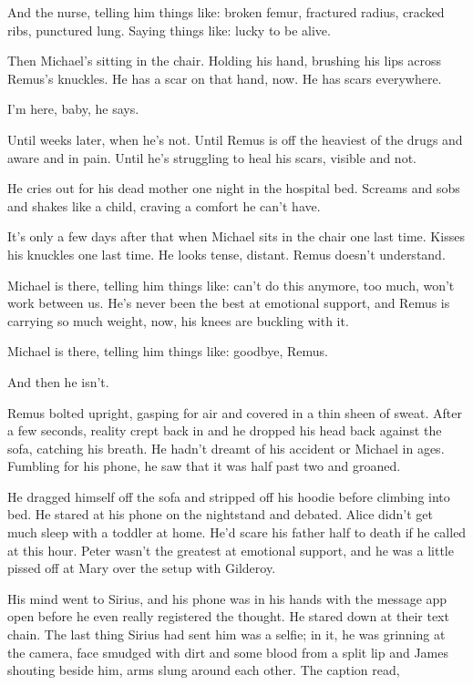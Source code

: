 And the nurse, telling him things like: broken femur, fractured radius, cracked ribs, punctured lung. Saying things like: lucky to be alive.

Then Michael’s sitting in the chair. Holding his hand, brushing his lips across Remus’s knuckles. He has a scar on that hand, now. He has scars everywhere.

I’m here, baby, he says.

Until weeks later, when he’s not. Until Remus is off the heaviest of the drugs and aware and in pain. Until he’s struggling to heal his scars, visible and not.

He cries out for his dead mother one night in the hospital bed. Screams and sobs and shakes like a child, craving a comfort he can’t have.

It’s only a few days after that when Michael sits in the chair one last time. Kisses his knuckles one last time. He looks tense, distant. Remus doesn’t understand.

Michael is there, telling him things like: can’t do this anymore, too much, won’t work between us. He’s never been the best at emotional support, and Remus is carrying so much weight, now, his knees are buckling with it.

Michael is there, telling him things like: goodbye, Remus.

And then he isn’t.

Remus bolted upright, gasping for air and covered in a thin sheen of sweat. After a few seconds, reality crept back in and he dropped his head back against the sofa, catching his breath. He hadn’t dreamt of his accident or Michael in ages. Fumbling for his phone, he saw that it was half past two and groaned.

He dragged himself off the sofa and stripped off his hoodie before climbing into bed. He stared at his phone on the nightstand and debated. Alice didn’t get much sleep with a toddler at home. He’d scare his father half to death if he called at this hour. Peter wasn’t the greatest at emotional support, and he was a little pissed off at Mary over the setup with Gilderoy.

His mind went to Sirius, and his phone was in his hands with the message app open before he even really registered the thought. He stared down at their text chain. The last thing Sirius had sent him was a selfie; in it, he was grinning at the camera, face smudged with dirt and some blood from a split lip and James shouting beside him, arms slung around each other. The caption read,

